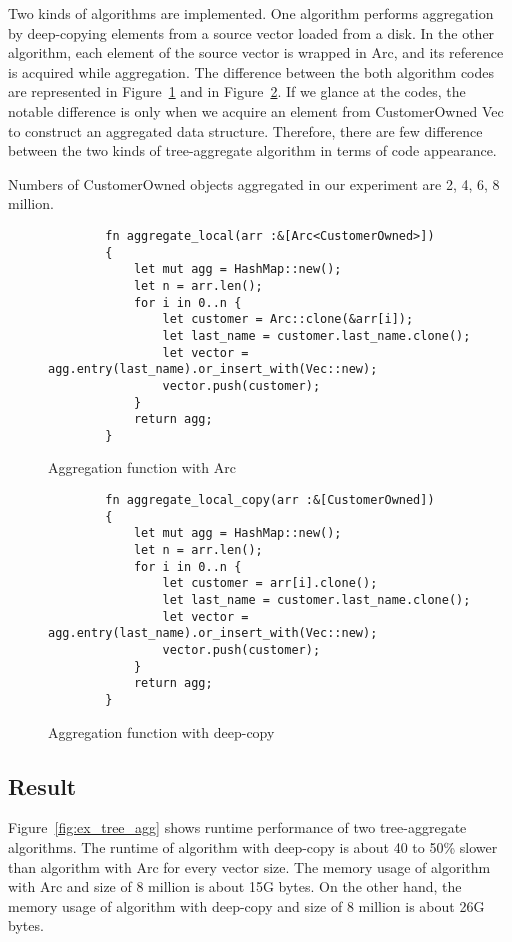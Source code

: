 Two kinds of algorithms are implemented. One algorithm performs aggregation by deep-copying elements from a source vector loaded from a disk. 
In the other algorithm, each element of the source vector is wrapped in Arc, and its reference is acquired while aggregation. 
The difference between the both algorithm codes are represented in Figure~\ref{fig:arc_tree} and in Figure~\ref{fig:deep_tree}.
If we glance at the codes, the notable difference is only when we acquire an element from CustomerOwned Vec to construct an aggregated data structure.
Therefore, there are few difference between the two kinds of tree-aggregate algorithm in terms of code appearance.

Numbers of CustomerOwned objects aggregated in our experiment are 2, 4, 6, 8 million. 

\begin{figure}[htb]
    \begin{lstlisting}
        fn aggregate_local(arr :&[Arc<CustomerOwned>]) 
        {   
            let mut agg = HashMap::new();
            let n = arr.len();
            for i in 0..n {
                let customer = Arc::clone(&arr[i]);
                let last_name = customer.last_name.clone();
                let vector = agg.entry(last_name).or_insert_with(Vec::new);
                vector.push(customer);
            }
            return agg;
        }
    \end{lstlisting}
    \caption{Aggregation function with Arc}
    \label{fig:arc_tree}
\end{figure}


\begin{figure}[htb]
    \begin{lstlisting}
        fn aggregate_local_copy(arr :&[CustomerOwned]) 
        {   
            let mut agg = HashMap::new();
            let n = arr.len();
            for i in 0..n {
                let customer = arr[i].clone();
                let last_name = customer.last_name.clone();
                let vector = agg.entry(last_name).or_insert_with(Vec::new);
                vector.push(customer);
            }
            return agg;
        }
    \end{lstlisting}
    \caption{Aggregation function with deep-copy}
    \label{fig:deep_tree}
\end{figure}


\subsection{Result}
Figure~\ref{fig:ex_tree_agg} shows runtime performance of two tree-aggregate algorithms. 
The runtime of algorithm with deep-copy is about 40 to 50\% slower than algorithm with Arc for every vector size. 
The memory usage of algorithm with Arc and size of 8 million is about 15G bytes. On the other hand, 
the memory usage of algorithm with deep-copy and size of 8 million is about 26G bytes.

